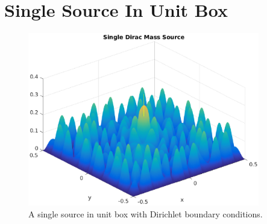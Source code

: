 \documentclass[10pt,a4paper]{article}
\begin{document}
\section*{Single Source In Unit Box}
\begin{figure}[H]
\centering
    \includegraphics[width=0.9\textwidth]{figures/SingleSource_2D_1000.eps}
	\caption{A single source in unit box with Dirichlet boundary conditions.}
  \label{fig:severalSourcesDBC3D}
\end{figure}
\end{document}
